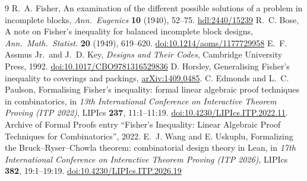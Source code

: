 \documentclass[11pt,a4paper]{article}
\theoremstyle{definition}
\begin{document}
\begin{thebibliography}{9}
 R.~A. Fisher, An examination of the different possible solutions of a problem in incomplete blocks, \emph{Ann.\ Eugenics} \textbf{10} (1940), 52--75. \href{https://hdl.handle.net/2440/15239}{hdl:2440/15239}
 R.~C. Bose, A note on Fisher's inequality for balanced incomplete block designs, \emph{Ann.\ Math.\ Statist.} \textbf{20} (1949), 619--620. \href{https://doi.org/10.1214/aoms/1177729958}{doi:10.1214/aoms/1177729958}
 E.~F. Assmus Jr.\ and J.~D. Key, \emph{Designs and Their Codes}, Cambridge University Press, 1992. \href{https://doi.org/10.1017/CBO9781316529836}{doi:10.1017/CBO9781316529836}
 D. Horsley, Generalising Fisher's inequality to coverings and packings, \href{https://arxiv.org/abs/1409.0485}{arXiv:1409.0485}.
 C. Edmonds and L.~C. Paulson, Formalising Fisher's inequality: formal linear algebraic proof techniques in combinatorics, in \emph{13th International Conference on Interactive Theorem Proving (ITP 2022)}, LIPIcs \textbf{237}, 11:1--11:19. \href{https://doi.org/10.4230/LIPIcs.ITP.2022.11}{doi:10.4230/LIPIcs.ITP.2022.11}. Archive of Formal Proofs entry ``Fisher's Inequality: Linear Algebraic Proof Techniques for Combinatorics'', 2022.
 E.~J. Wang and E. Uskuplu, Formalizing the Bruck--Ryser--Chowla theorem: combinatorial design theory in Lean, in \emph{17th International Conference on Interactive Theorem Proving (ITP 2026)}, LIPIcs \textbf{382}, 19:1--19:19. \href{https://doi.org/10.4230/LIPIcs.ITP.2026.19}{doi:10.4230/LIPIcs.ITP.2026.19}
\end{thebibliography}
\end{document}

